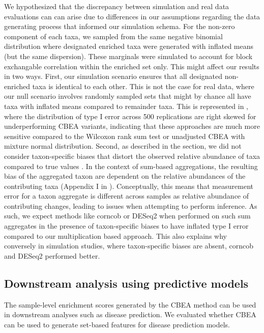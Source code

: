 \documentclass[10pt,letterpaper]{article}
\begin{document}
We hypothesized that the discrepancy between simulation and real data evaluations can can arise due to differences in our assumptions regarding the data generating process that informed our simulation schema. For the non-zero component of each taxa, we sampled from the same negative binomial distribution where designated enriched taxa were generated with inflated means (but the same dispersion). These marginals were simulated to account for block exchangable correlation within the enriched set only. This might affect our results in two ways. First, our simulation scenario ensures that all designated non-enriched taxa is identical to each other. This is not the case for real data, where our null scenario involves randomly sampled sets that might by chance all have taxa with inflated means compared to remainder taxa. This is represented in , where the distribution of type I error across 500 replications are right skewed for underperforming CBEA variants, indicating that these approaches are much more sensitive compared to the Wilcoxon rank sum test or unadjusted CBEA with mixture normal distribution. Second, as described in the  section, we did not consider taxon-specific biases that distort the observed relative abundance of taxa compared to true values \cite{mclaren2019}. In the context of sum-based aggregations, the resulting bias of the aggregated taxon are dependent on the relative abundances of the contributing taxa (Appendix I in \cite{mclaren2019}). Conceptually, this means that measurement error for a taxon aggregate is different across samples as relative abundance of contributing changes, leading to issues when attempting to perform inference. As such, we expect methods like corncob or DESeq2 when performed on such sum aggregates in the presence of taxon-specific biases to have inflated type I error compared to our multiplication based approach. This also explains why conversely in simulation studies, where taxon-specific biases are absent, corncob and DESeq2 performed better. 

\subsection*{Downstream analysis using predictive models}
The sample-level enrichment scores generated by the CBEA method can be used in downstream analyses such as disease prediction. We evaluated whether CBEA can be used to generate set-based features for disease prediction models. 
\end{document}
